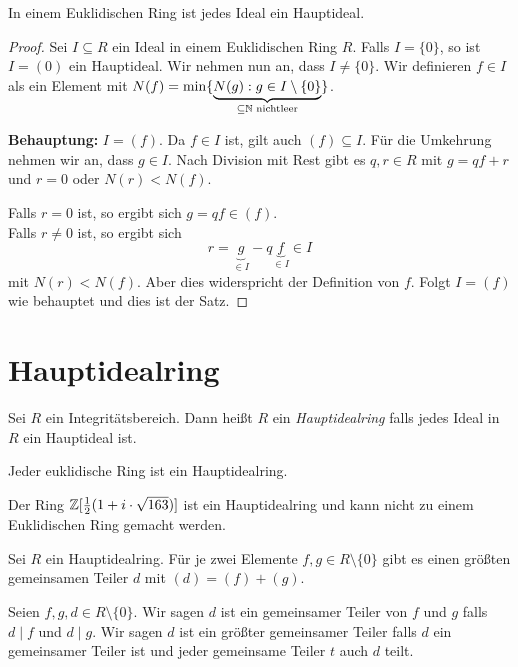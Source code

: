 \begin{theorem}
	In einem Euklidischen Ring ist jedes Ideal ein Hauptideal.
\end{theorem}

\begin{proof}
	Sei $I \subseteq R$ ein Ideal in einem Euklidischen Ring $R$.
	Falls $I = \{0\}$, so ist $I = (0)$ ein Hauptideal.
	Wir nehmen nun an, dass $I \neq \{0\}$.
	Wir definieren $f \in I$ als ein Element mit $N(f) = \min \{\underbrace{N(g) : g \in I \setminus \{0\}}_{\subseteq \mathbb{N} \text{ nichtleer}}\}$.

	\textbf{Behauptung:} $I = (f)$. Da $f \in I$ ist, gilt auch $(f) \subseteq I$.
	Für die Umkehrung nehmen wir an, dass $g \in I$. 
	Nach Division mit Rest gibt es  $q,r \in R$ mit $g = q f + r$ und $r = 0$ oder $N(r) < N(f)$.

	Falls $r = 0$ ist, so ergibt sich $g = qf \in (f)$.\\
	Falls $r \neq 0$ ist, so ergibt sich 
	\[
		r = \underbrace{g}_{\in I} - q \underbrace{f}_{\in I} \in I
	\]
	mit $N(r) < N(f)$.
	Aber dies widerspricht der Definition von $f$.
	Folgt $I = (f)$ wie behauptet und dies ist der Satz.
\end{proof}

\section{Hauptidealring}
\begin{definition}
	Sei $R$ ein Integritätsbereich. Dann heißt $R$ ein \emph{Hauptidealring} falls jedes Ideal in $R$ ein Hauptideal ist.
\end{definition}

\begin{eg}
	Jeder euklidische Ring ist ein Hauptidealring.
\end{eg}

\begin{remark}
	Der Ring $\mathbb{Z}[\frac{1}{2}(1+i\cdot \sqrt{163})]$ ist ein Hauptidealring und kann nicht zu einem Euklidischen Ring gemacht werden.
\end{remark}

\begin{proposition}
	Sei $R$ ein Hauptidealring. Für je zwei Elemente $f,g \in R \setminus \{0\} $ gibt es einen größten gemeinsamen Teiler $d$ mit $(d) = (f) + (g)$.
\end{proposition}

\begin{definition}
	Seien $f,g,d \in R \setminus \{0\} $. Wir sagen $d $ ist ein gemeinsamer Teiler von $f$ und $g$ falls $d \mid f$ und $d \mid g$.
	Wir sagen $d$ ist ein größter gemeinsamer Teiler falls $d$ ein gemeinsamer Teiler ist und jeder gemeinsame Teiler $t$ auch $d$ teilt.
\end{definition}

